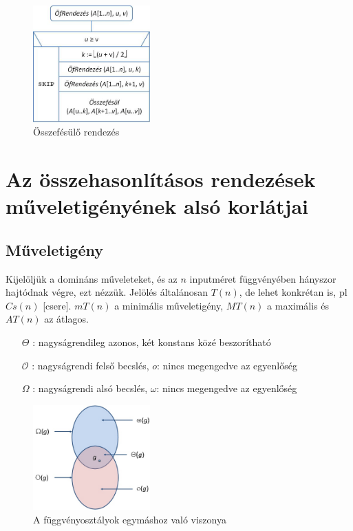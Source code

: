 \documentclass[12pt,margin=0px]{article}
\begin{document}
	\begin{figure}[H]
		\centering
		\includegraphics[width=0.4\textwidth]{img/mergesort_alg1.png}
		\caption{Összefésülő rendezés}
	\end{figure}
	
	\section*{Az összehasonlításos rendezések műveletigényének alsó korlátjai}
	
	\subsection*{Műveletigény}
	
    Kijelöljük a domináns műveleteket, és az $n$ inputméret függvényében hányszor hajtódnak végre, ezt nézzük. Jelölés általánosan $T(n)$, de lehet konkrétan is, pl $Cs(n)$ [csere]. $mT(n)$ a minimális műveletigény, $MT(n)$ a maximális és $AT(n)$ az átlagos.	
	\begin{itemize}
		\item[$\Theta$]: nagyságrendileg azonos, két konstans közé beszorítható
		\item[$\mathcal{O}$]: nagyságrendi felső becslés, $o$: nincs megengedve az egyenlőség
		\item[$\Omega$]: nagyságrendi alsó becslés, $\omega$: nincs megengedve az egyenlőség
	\end{itemize}
	
	\begin{figure}[H]
		\centering
        \includegraphics[width=0.4\textwidth]{img/functionsrelations.png}
		\caption{A függvényosztályok egymáshoz való viszonya}
	\end{figure}
\end{document}
